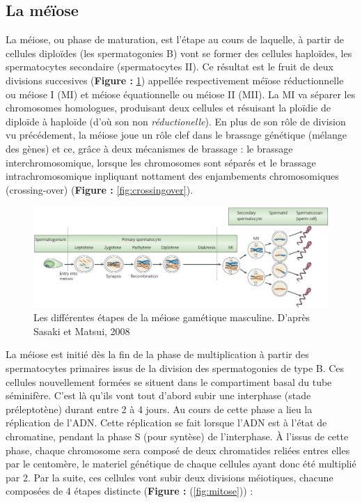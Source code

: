\documentclass[12pt,twoside]{reedthesis}
\theoremstyle{definition}
\theoremstyle{definition}
\theoremstyle{remark}
\begin{document}
  \subsection{La méïose}\label{la-meiose}
  
  La méiose, ou phase de maturation, est l'étape au cours de laquelle, à
  partir de cellules diploïdes (les spermatogonies B) vont se former des
  cellules haploïdes, les spermatocytes secondaire (spermatocytes II). Ce
  résultat est le fruit de deux divisions succesives (\textbf{Figure :
  }\ref{fig:meiose}) appellée respectivement méïose réductionnelle ou
  méiose I (MI) et méiose équationnelle ou méiose II (MII). La MI va
  séparer les chromosomes homologues, produisant deux cellules et
  résuisant la ploïdie de diploïde à haploïde (d'où son non
  \emph{réductionelle}). En plus de son rôle de division vu précédement,
  la méiose joue un rôle clef dans le brassage génétique (mélange des
  gènes) et ce, grâce à deux mécanismes de brassage : le brassage
  interchromosomique, lorsque les chromosomes sont séparés et le brassage
  intrachromosomique inpliquant nottament des enjambements chromosomiques
  (crossing-over) (\textbf{Figure : }\ref{fig:crossingover}).
  
  \begin{figure}
  
  {\centering \includegraphics[scale=0.35]{figure/Meiosis_Stages} 
  
  }
  
  \caption{Les différentes étapes de la méiose gamétique masculine. D’après Sasaki et Matsui,
  2008}\label{fig:meiose}
  \end{figure}
  
  La méiose est initié dès la fin de la phase de multiplication à partir
  des spermatocytes primaires issus de la division des spermatogonies de
  type B. Ces cellules nouvellement formées se situent dans le
  compartiment basal du tube séminifère. C'est là qu'ils vont tout d'abord
  subir une interphase (stade préleptotène) durant entre 2 à 4 jours. Au
  cours de cette phase a lieu la réplication de l'ADN. Cette réplication
  se fait lorsque l'ADN est à l'état de chromatine, pendant la phase S
  (pour syntèse) de l'interphase. À l'issus de cette phase, chaque
  chromosome sera composé de deux chromatides reliées entres elles par le
  centomère, le materiel génétique de chaque cellules ayant donc été
  multiplié par 2. Par la suite, ces cellules vont subir deux divisions
  méiotiques, chacune composées de 4 étapes distincte (\textbf{Figure :
  }(\ref{fig:mitose})) :
  
\end{document}
